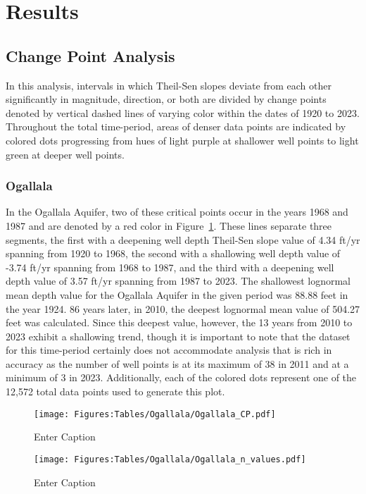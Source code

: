 \section*{Results}

\subsection*{Change Point Analysis}
In this analysis, intervals in which Theil-Sen slopes deviate from each other significantly in magnitude, direction, or both are divided by change points denoted by vertical dashed lines of varying color within the dates of 1920 to 2023. Throughout the total time-period, areas of denser data points are indicated by colored dots progressing from hues of light purple at shallower well points to light green at deeper well points. 
\subsubsection*{Ogallala}
In the Ogallala Aquifer, two of these critical points occur in the years 1968 and 1987 and are denoted by a red color in Figure~\ref{fig:OG_CP}. These lines separate three segments, the first with a deepening well depth Theil-Sen slope value of 4.34 ft/yr spanning from 1920 to 1968, the second with a shallowing well depth value of -3.74 ft/yr spanning from 1968 to 1987, and the third with a deepening well depth value of 3.57 ft/yr spanning from 1987 to 2023. The shallowest lognormal mean depth value for the Ogallala Aquifer in the given period was 88.88 feet in the year 1924. 86 years later, in 2010, the deepest lognormal mean value of 504.27 feet was calculated. Since this deepest value, however, the 13 years from 2010 to 2023 exhibit a shallowing trend, though it is important to note that the dataset for this time-period certainly does not accommodate analysis that is rich in accuracy as the number of well points is at its maximum of 38 in 2011 and at a minimum of 3 in 2023. Additionally, each of the colored dots represent one of the 12,572 total data points used to generate this plot.

\begin{figure}[H]
    \centering
    \texttt{[image: Figures:Tables/Ogallala/Ogallala\_CP.pdf]}
    \caption{Enter Caption}
    \label{fig:OG_CP}
\end{figure}
\begin{figure}[H]
    \centering
    \texttt{[image: Figures:Tables/Ogallala/Ogallala\_n\_values.pdf]}
    \caption{Enter Caption}
    \label{fig:OG_n_value}
\end{figure}

